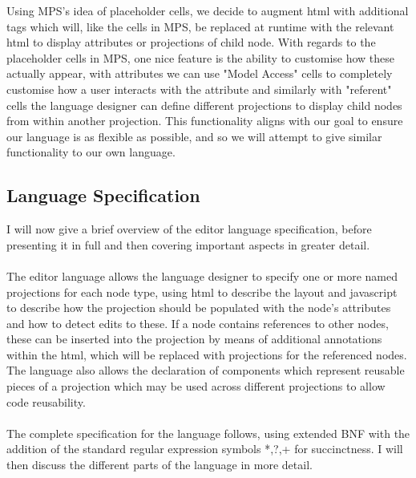 \documentclass{article}
\begin{document}
Using MPS's idea of placeholder cells, we decide to augment html with additional tags which will, like the cells in MPS, be replaced at runtime with the relevant html to display attributes or projections of child node. With regards to the placeholder cells in MPS, one nice feature is the ability to customise how these actually appear, with attributes we can use "Model Access" cells to completely customise how a user interacts with the attribute and similarly with "referent" cells the language designer can define different projections to display child nodes from within another projection. This functionality aligns with our goal to ensure our language is as flexible as possible, and so we will attempt to give similar functionality to our own language.

\subsection{Language Specification}
I will now give a brief overview of the editor language specification, before presenting it in full and then covering important aspects in greater detail. 
\\
\\
The editor language allows the language designer to specify one or more named projections for each node type, using html to describe the layout and javascript to describe how the projection should be populated with the node's attributes and how to detect edits to these. If a node contains references to other nodes, these can be inserted into the projection by means of additional annotations within the html, which will be replaced with projections for the referenced nodes. The language also allows the declaration of components which represent reusable pieces of a projection which may be used across different projections to allow code reusability. 
\\
\\
The complete specification for the language follows, using extended BNF with the addition of the standard regular expression symbols *,?,+ for succinctness. I will then discuss the different parts of the language in more detail.

\setlength{\grammarparsep}{12pt plus 1pt minus 1pt} %
\setlength{\grammarindent}{5em} %
\end{document}

